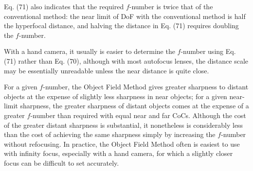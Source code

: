 \documentclass[11pt, oneside]{scrartcl}   	%
\begin{document}
Eq. (71) also indicates that the required $f$-number is twice that of the conventional method: the near limit of DoF with the conventional method is half the hyperfocal distance, and halving the distance in Eq. (71) requires doubling the $f$-number.

With a hand camera, it usually is easier to determine the $f$-number using Eq. (71) rather than Eq. (70), although with most autofocus lenses, the distance scale may be essentially unreadable unless the near distance is quite close.

For a given $f$-number, the Object Field Method gives greater sharpness to distant objects at the expense of slightly less sharpness in near objects; for a given near-limit sharpness, the greater sharpness of distant objects comes at the expense of a greater $f$-number than required with equal near and far CoCs. Although the cost of the greater distant sharpness is substantial, it nonetheless is considerably less than the cost of achieving the same sharpness simply by increasing the $f$-number without refocusing. In practice, the Object Field Method often is easiest to use with infinity focus, especially with a hand camera, for which a slightly closer focus can be difficult to set accurately.
\end{document}
